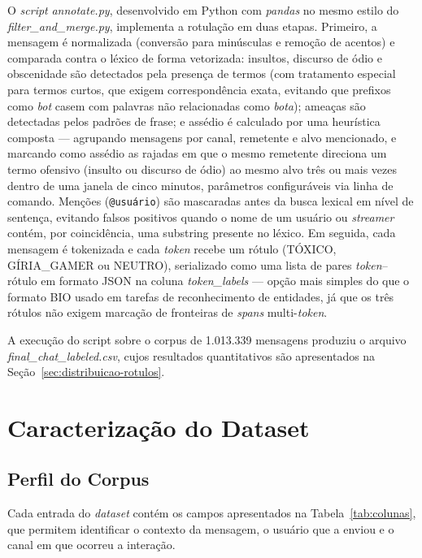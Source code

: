 \documentclass{eic-bcc-tcc}
\begin{document}
O \textit{script} \textit{annotate.py}, desenvolvido em Python com \textit{pandas} no mesmo estilo do \textit{filter\_and\_merge.py}, implementa a rotulação em duas etapas. Primeiro, a mensagem é normalizada (conversão para minúsculas e remoção de acentos) e comparada contra o léxico de forma vetorizada: insultos, discurso de ódio e obscenidade são detectados pela presença de termos (com tratamento especial para termos curtos, que exigem correspondência exata, evitando que prefixos como \textit{bot} casem com palavras não relacionadas como \textit{bota}); ameaças são detectadas pelos padrões de frase; e assédio é calculado por uma heurística composta — agrupando mensagens por canal, remetente e alvo mencionado, e marcando como assédio as rajadas em que o mesmo remetente direciona um termo ofensivo (insulto ou discurso de ódio) ao mesmo alvo três ou mais vezes dentro de uma janela de cinco minutos, parâmetros configuráveis via linha de comando. Menções (\texttt{@usuário}) são mascaradas antes da busca lexical em nível de sentença, evitando falsos positivos quando o nome de um usuário ou \textit{streamer} contém, por coincidência, uma substring presente no léxico. Em seguida, cada mensagem é tokenizada e cada \textit{token} recebe um rótulo (TÓXICO, GÍRIA\_GAMER ou NEUTRO), serializado como uma lista de pares \textit{token}–rótulo em formato JSON na coluna \textit{token\_labels} — opção mais simples do que o formato BIO usado em tarefas de reconhecimento de entidades, já que os três rótulos não exigem marcação de fronteiras de \textit{spans} multi-\textit{token}.

A execução do script sobre o corpus de 1.013.339 mensagens produziu o arquivo \textit{final\_chat\_labeled.csv}, cujos resultados quantitativos são apresentados na Seção~\ref{sec:distribuicao-rotulos}.

\chapter{Caracterização do Dataset}
\label{cha:caracterizacao}

\section{Perfil do Corpus}

Cada entrada do \textit{dataset} contém os campos apresentados na Tabela~\ref{tab:colunas}, que permitem identificar o contexto da mensagem, o usuário que a enviou e o canal em que ocorreu a interação.
\end{document}
